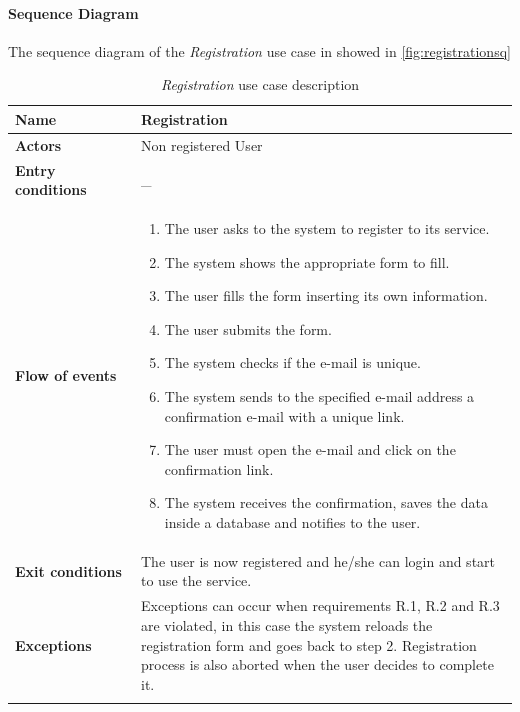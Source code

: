 \paragraph*{Sequence Diagram\\}
The sequence diagram of the \emph{Registration} use case in showed in \autoref{fig:registrationsq}
\newpage
\begin{longtable}{p{0.25\linewidth}|p{0.75\linewidth}}
	\hline
		\label{tab:registrationTAB}
	\textbf{Name} & \textbf{Registration} \\
	\hline
	\textbf{Actors} & Non registered User \\
	\hline
	\textbf{Entry conditions} & \_ \\
	\hline
	\textbf{Flow of events} & 
	\begin{enumerate}
		\item The user asks to the system to register to its service.
		\item The system shows the appropriate form to fill.
		\item The user fills the form inserting its own information.
		\item The user submits the form.
		\item The system checks if the e-mail is unique.
		\item The system sends to the specified e-mail address a confirmation e-mail with a unique link.
		\item The user must open the e-mail and click on the confirmation link.
		\item The system receives the confirmation, saves the data inside a database and notifies to the user.
	\end{enumerate}\\
	\hline
	\textbf{Exit conditions} & The user is now registered and he/she can login and start to use the service.\\
	\hline
	\textbf{Exceptions} & Exceptions can occur when requirements R.1, R.2 and R.3 are violated, in this case the system reloads the registration form and goes back to step 2. 
	Registration process is also aborted when the user decides to complete it. \\
	\hline
	\caption{\emph{Registration} use case description}
\end{longtable}

